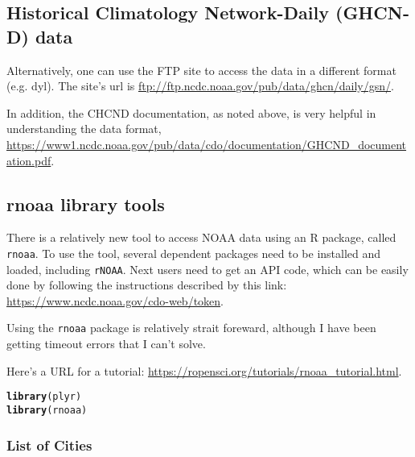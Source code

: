 \documentclass{article}\usepackage[]{graphicx}\usepackage[]{color}
\makeatletter
\newcommand{\hlstd}[1]{\textcolor[rgb]{0.345,0.345,0.345}{#1}}%
\newcommand{\hlkwd}[1]{\textcolor[rgb]{0.737,0.353,0.396}{\textbf{#1}}}%
\newenvironment{kframe}{%
 \def\at@end@of@kframe{}%
 \ifinner\ifhmode%
  \def\at@end@of@kframe{\end{minipage}}%
  \begin{minipage}{\columnwidth}%
 \fi\fi%
 \def\FrameCommand##1{\hskip\@totalleftmargin \hskip-\fboxsep
 \colorbox{shadecolor}{##1}\hskip-\fboxsep
     \hskip-\linewidth \hskip-\@totalleftmargin \hskip\columnwidth}%
 \MakeFramed {\advance\hsize-\width
   \@totalleftmargin\z@ \linewidth\hsize
   \@setminipage}}%
 {\par\unskip\endMakeFramed%
 \at@end@of@kframe}
\newenvironment{knitrout}{}{} %
\makeatother
\begin{document}
\subsection{Historical Climatology Network-Daily (GHCN‐D) data}

Alternatively, one can use the FTP site to access the data in a different format (e.g. dyl). The site's url is \url{ftp://ftp.ncdc.noaa.gov/pub/data/ghcn/daily/gsn/}. 

In addition, the CHCND documentation, as noted above, is very helpful in understanding the data format, \url{https://www1.ncdc.noaa.gov/pub/data/cdo/documentation/GHCND_documentation.pdf}.

\subsection{rnoaa library tools}

There is a relatively new tool to access NOAA data using an R package, called \texttt{rnoaa}. To use the tool, several dependent packages need to be installed and loaded, including \texttt{rNOAA}. Next users need to get an API code, which can be easily done by following the instructions described by this link: \url{https://www.ncdc.noaa.gov/cdo-web/token}.

Using the \texttt{rnoaa} package is relatively strait foreward, although I have been getting timeout errors that I can't solve. 

Here's a URL for a tutorial: \url{https://ropensci.org/tutorials/rnoaa_tutorial.html}.

\begin{knitrout}
\color{fgcolor}\begin{kframe}
\begin{alltt}
\hlkwd{library}\hlstd{(plyr)}
\hlkwd{library}\hlstd{(rnoaa)}
\end{alltt}


{\ttfamily\noindent\bfseries\color{errorcolor}{\#\# Error in library(rnoaa): there is no package called 'rnoaa'}}\end{kframe}
\end{knitrout}



\subsubsection{List of Cities}
\end{document}
